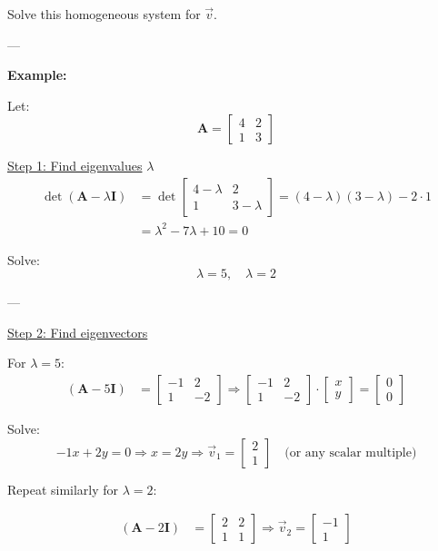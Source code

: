 Solve this homogeneous system for \(\vec{v}\).

---

\textbf{Example:}

Let:
\[
\textbf{A} = 
\begin{bmatrix}
4 & 2 \\
1 & 3
\end{bmatrix}
\]

\underline{Step 1: Find eigenvalues} \(\lambda\)
\begin{align*}
\det(\textbf{A} - \lambda \textbf{I}) &= 
\det\begin{bmatrix}
4 - \lambda & 2 \\
1 & 3 - \lambda
\end{bmatrix}
= (4 - \lambda)(3 - \lambda) - 2 \cdot 1 \\
&= \lambda^2 - 7\lambda + 10 = 0
\end{align*}

Solve:
\[
\lambda = 5, \quad \lambda = 2
\]

---

\underline{Step 2: Find eigenvectors}

For \(\lambda = 5\):
\begin{align*}
(\textbf{A} - 5\textbf{I}) &= 
\begin{bmatrix}
-1 & 2 \\
1 & -2
\end{bmatrix}
\Rightarrow
\begin{bmatrix}
-1 & 2 \\
1 & -2
\end{bmatrix}
\cdot 
\begin{bmatrix}
x \\
y
\end{bmatrix}
= 
\begin{bmatrix}
0 \\
0
\end{bmatrix}
\end{align*}

Solve:
\[
-1x + 2y = 0 \Rightarrow x = 2y \Rightarrow \vec{v}_1 =
\begin{bmatrix}
2 \\
1
\end{bmatrix}
\quad \text{(or any scalar multiple)}
\]

Repeat similarly for \(\lambda = 2\):

\begin{align*}
(\textbf{A} - 2\textbf{I}) &= 
\begin{bmatrix}
2 & 2 \\
1 & 1
\end{bmatrix}
\Rightarrow
\vec{v}_2 =
\begin{bmatrix}
-1 \\
1
\end{bmatrix}
\end{align*}

